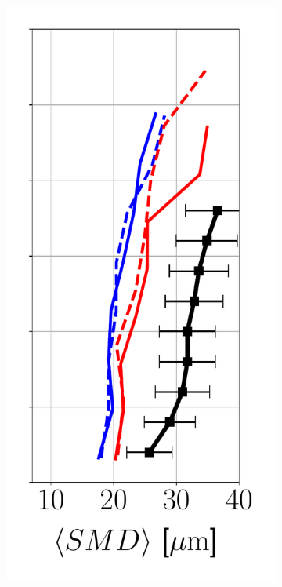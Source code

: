 \begin{figure}[h!]
\begin{subfigure}[b]{0.2\textwidth}
   \includegraphics[scale=0.35]{./part2_developments/figures_ch6_lagrangian_JICF/params_resol_and_xInj/profiles/SMD_along_z}
\end{subfigure}
\hspace*{0.1in}

\end{figure}
